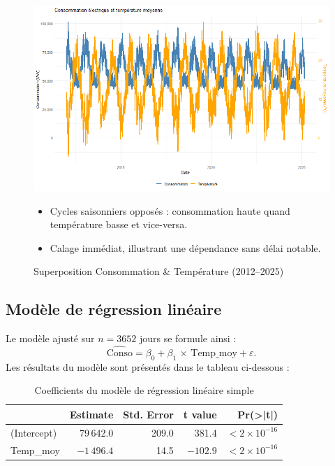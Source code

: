 \documentclass[12pt,a4paper]{article}
\begin{document}
\begin{figure}[H]
  \centering
  \begin{minipage}[t]{0.9\textwidth}
    \centering
    \includegraphics[width=\linewidth]{Projet_partie_A/conso_vs_temp_superpose.png}
    \caption{Superposition Consommation \& Température (2012–2025)}
    \label{fig:timeseries_conso_temp}
  \end{minipage}
    \begin{itemize}
      \item Cycles saisonniers opposés : consommation haute quand température basse et vice-versa.  
      \item Calage immédiat, illustrant une dépendance sans délai notable.  
    \end{itemize}
\end{figure}

\subsection{Modèle de régression linéaire}
Le modèle ajusté sur $n = 3652$ jours se formule ainsi :
\[
\widehat{\text{Conso}}
= \beta_0 + \beta_1\,\times\,\text{Temp\_moy} + \varepsilon.
\]
Les résultats du modèle sont présentés dans le tableau ci‑dessous :

\begin{table}[H]
  \centering
  \begin{tabular}{lrrrr}
    \toprule
                 & \textbf{Estimate} & \textbf{Std. Error} & \textbf{t value} & \textbf{Pr(>|t|)} \\
    \midrule
    (Intercept)  & 79\,642.0         & 209.0               & 381.4            & $<2\times10^{-16}$ \\
    Temp\_moy    & $-1\,496.4$       & 14.5                & $-102.9$         & $<2\times10^{-16}$ \\
    \bottomrule
  \end{tabular}
  \caption{Coefficients du modèle de régression linéaire simple}
  \label{tab:reglin}
\end{table}
\end{document}
